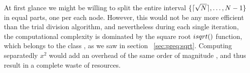 At first glance we might be willing to split the entire interval
$\{ \lceil\sqrt{N}\rceil, \ldots, N-1 \}$ in equal parts, one per each
node. However, this would not be any more efficient than the trial division
algorithm, and nevertheless during each single iteration, the computational
complexity is dominated by the square root $\dsqrt$ function, which belongs to
the class , as we saw in section ~\ref{sec:preq:sqrt}.
Computing separatedly $x^2$ would add an overhead of the same order of magnitude
, and thus result in a complete waste of resources.

